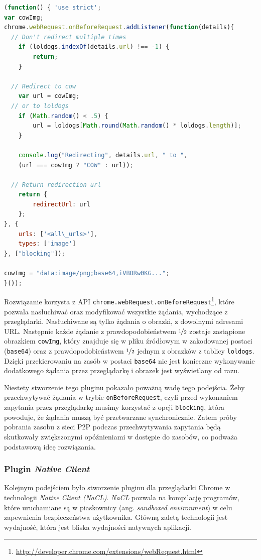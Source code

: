 \documentclass[a4paper,11pt]{scrartcl}
\newcommand{\f}{\texttt}
\begin{document}
\begin{lstlisting}[language={JavaScript}, label={lst_plugin_1}, 
  caption={Kod rozszerzenia dla przeglądarki Chrome, realizujący \textit{proof-of-concept}.}]
(function() { 'use strict';
var cowImg;
chrome.webRequest.onBeforeRequest.addListener(function(details){
  // Don't redirect multiple times
	if (loldogs.indexOf(details.url) !== -1) {
		return;
	}
	
  // Redirect to cow
	var url = cowImg;
  // or to loldogs
	if (Math.random() < .5) {
		url = loldogs[Math.round(Math.random() * loldogs.length)];
	}
	
	console.log("Redirecting", details.url, " to ", 
    (url === cowImg ? "COW" : url));
    
  // Return redirection url
	return {
		redirectUrl: url
	};
}, {
	urls: ['<all\_urls>'],
	types: ['image']
}, ["blocking"]);

cowImg = "data:image/png;base64,iVBORw0KG...";
}());
\end{lstlisting}

Rozwiązanie korzysta z API \f{chrome.webRequest.onBeforeRequest}\footnote{\url{http://developer.chrome.com/extensions/webRequest.html}}, które pozwala nasłuchiwać oraz modyfikować wszystkie żądania, wychodzące z przeglądarki. Nasłuchiwane są tylko żądania o obrazki, z dowolnymi adresami URL. Następnie każde żądanie z prawdopodobieństwem $\nicefrac{1}{2}$ zostaje zastąpione obrazkiem \f{cowImg}, który znajduje się w pliku źródłowym w zakodowanej postaci (\f{base64}) oraz z prawdopodobieństwem $\nicefrac{1}{2}$ jednym z obrazków z tablicy \f{loldogs}. Dzięki przekierowaniu na zasób w postaci \f{base64} nie jest konieczne wykonywanie dodatkowego żądania przez przeglądarkę i obrazek jest wyświetlany od razu. 

Niestety stworzenie tego pluginu pokazało poważną wadę tego podejścia. Żeby przechwytywać żądania w trybie \f{onBeforeRequest}, czyli przed wykonaniem zapytania przez przeglądarkę musimy korzystać z opcji \f{blocking}, która powoduje, że żądania muszą być przetwarzane synchronicznie. Zatem próby pobrania zasobu z sieci P2P podczas przechwytywania zapytania będą skutkowały zwiększonymi opóźnieniami w dostępie do zasobów, co podważa podstawową ideę rozwiązania.

\subsubsection{Plugin \textit{Native Client}}
\label{sect_plugin_2}
Kolejnym podejściem było stworzenie pluginu dla przeglądarki Chrome w technologii \textit{Native Client (NaCL)}. \textit{NaCL} pozwala na kompilację programów, które uruchamiane są w piaskownicy (ang. \textit{sandboxed environment}) w celu zapewnienia bezpieczeństwa użytkownika. Główną zaletą technologii jest wydajność, która jest bliska wydajności natywnych aplikacji.
\end{document}
